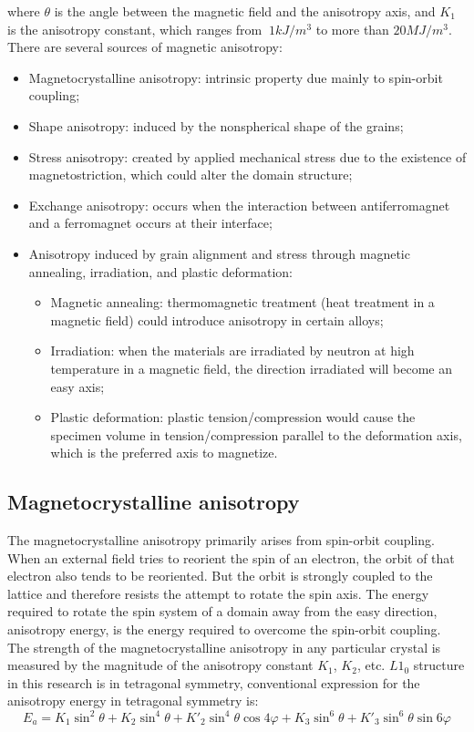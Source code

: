 where $\theta$ is the angle between the magnetic field and the anisotropy axis, and $K_1$ is the
anisotropy constant, which ranges from $~1 kJ/m^3$ to more than $20 MJ/m^3$.  There are
several sources of magnetic anisotropy:
\begin{itemize}
\item Magnetocrystalline anisotropy: intrinsic property due mainly to spin-orbit coupling;
\item Shape anisotropy: induced by the nonspherical shape of the grains; 
\item Stress anisotropy: created by applied mechanical stress due to the existence of magnetostriction, which could alter the domain structure;
\item Exchange anisotropy: occurs when the interaction between antiferromagnet and a ferromagnet occurs at their interface;
\item Anisotropy induced by grain alignment and stress through magnetic
annealing, irradiation, and plastic deformation:
\begin{itemize}
\item Magnetic annealing: thermomagnetic treatment (heat treatment in a magnetic field) could introduce anisotropy in certain alloys;
\item Irradiation: when the materials are irradiated by neutron at high temperature in a magnetic field, the direction irradiated will become an
easy axis;
\item Plastic deformation: plastic tension/compression would cause the specimen volume in tension/compression parallel to the deformation axis, which is the preferred axis to magnetize.
\end{itemize}

\end{itemize}

\subsection{Magnetocrystalline anisotropy}
The magnetocrystalline anisotropy primarily arises from spin-orbit coupling.
When an external field tries to reorient the spin of an electron, the orbit of that electron
also tends to be reoriented. But the orbit is strongly coupled to the lattice and therefore
resists the attempt to rotate the spin axis. The energy required to rotate the spin system of
a domain away from the easy direction, anisotropy energy, is the energy required to
overcome the spin-orbit coupling. The strength of the magnetocrystalline anisotropy in
any particular crystal is measured by the magnitude of the anisotropy constant $K_1$, $K_2$, etc.
$L1_0$ structure in this research is in tetragonal symmetry, conventional expression for the
anisotropy energy in tetragonal symmetry is:
\begin{equation}
E_a = K_1 \sin^2 \theta + K_2 \sin^4 \theta + K'_2 \sin^4  \theta \cos 4\varphi + K_3 \sin^6 \theta +K'_3 \sin^6 \theta \sin 6 \varphi
\end{equation}

